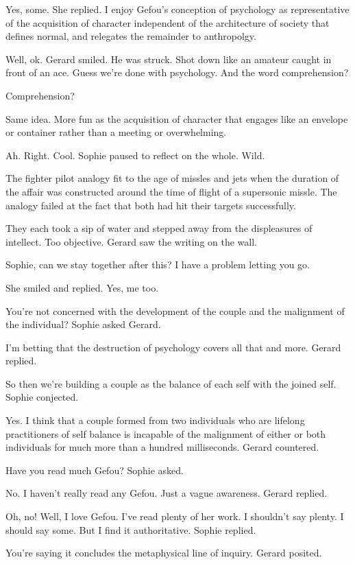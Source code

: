 Yes, some.  She replied.  I enjoy Gefou's conception of psychology as
representative of the acquisition of character independent of the
architecture of society that defines normal, and relegates the
remainder to anthropolgy.

Well, ok.  Gerard smiled.  He was struck.  Shot down like an amateur
caught in front of an ace.  Guess we're done with psychology.  And the
word comprehension?

Comprehension?

Same idea.  More fun as the acquisition of character that engages like
an envelope or container rather than a meeting or overwhelming.  

Ah.  Right.  Cool.  Sophie paused to reflect on the whole.  Wild.  

The fighter pilot analogy fit to the age of missles and jets when the
duration of the affair was constructed around the time of flight of a
supersonic missle.  The analogy failed at the fact that both had hit
their targets successfully.

They each took a sip of water and stepped away from the displeasures
of intellect.  Too objective.  Gerard saw the writing on the wall.

Sophie, can we stay together after this?  I have a problem letting you
go.

She smiled and replied.  Yes, me too.



You're not concerned with the development of the couple and the
malignment of the individual?  Sophie asked Gerard.

I'm betting that the destruction of psychology covers all that and
more.  Gerard replied.

So then we're building a couple as the balance of each self with the
joined self.  Sophie conjected.

Yes.  I think that a couple formed from two individuals who are
lifelong practitioners of self balance is incapable of the malignment
of either or both individuals for much more than a hundred
milliseconds.  Gerard countered.

Have you read much Gefou?  Sophie asked.

No.  I haven't really read any Gefou.  Just a vague awareness.  Gerard
replied.

Oh, no!  Well, I love Gefou.  I've read plenty of her work.  I
shouldn't say plenty.  I should say some.  But I find it
authoritative.  Sophie replied.

You're saying it concludes the metaphysical line of inquiry.  Gerard
posited.

